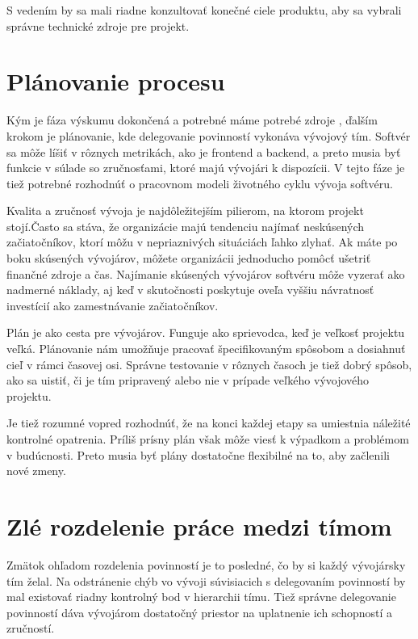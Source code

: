 \documentclass[10pt,twoside,slovak,a4paper]{article}
\begin{document}
S vedením by sa mali riadne konzultovať konečné ciele produktu, aby sa vybrali správne technické zdroje pre projekt.















\section{Plánovanie procesu}
Kým je fáza výskumu dokončená a potrebné máme potrebé zdroje , ďalším krokom je plánovanie, kde delegovanie povinností vykonáva vývojový tím. Softvér sa môže líšiť v rôznych metrikách, ako je frontend a backend, a preto musia byť funkcie v súlade so zručnosťami, ktoré majú vývojári k dispozícii. V tejto fáze je tiež potrebné rozhodnúť o pracovnom modeli životného cyklu vývoja softvéru.

Kvalita a zručnosť vývoja je najdôležitejším pilierom, na ktorom projekt stojí.Často sa stáva, že organizácie majú tendenciu najímať neskúsených začiatočníkov, ktorí môžu v nepriaznivých situáciách ľahko zlyhať.
Ak máte po boku skúsených vývojárov, môžete organizácii jednoducho pomôcť ušetriť finančné zdroje a čas. Najímanie skúsených vývojárov softvéru môže vyzerať ako nadmerné náklady, aj keď v skutočnosti poskytuje oveľa vyššiu návratnosť investícií ako zamestnávanie začiatočníkov.

Plán je ako cesta pre vývojárov. Funguje ako sprievodca, keď je veľkosť projektu veľká. Plánovanie nám umožňuje pracovať špecifikovaným spôsobom a dosiahnuť cieľ v rámci časovej osi. Správne testovanie v rôznych časoch je tiež dobrý spôsob, ako sa uistiť, či je tím pripravený alebo nie v prípade veľkého vývojového projektu.

Je tiež rozumné vopred rozhodnúť, že na konci každej etapy sa umiestnia náležité kontrolné opatrenia. Príliš prísny plán však môže viesť k výpadkom a problémom v budúcnosti. Preto musia byť plány dostatočne flexibilné na to, aby začlenili nové zmeny.

\section{Zlé rozdelenie práce medzi tímom}

Zmätok ohľadom rozdelenia povinností je to posledné, čo by si každý vývojársky tím želal. Na odstránenie chýb vo vývoji súvisiacich s delegovaním povinností by mal existovať riadny kontrolný bod v hierarchii tímu. Tiež správne delegovanie povinností dáva vývojárom dostatočný priestor na uplatnenie ich schopností a zručností.
\end{document}
